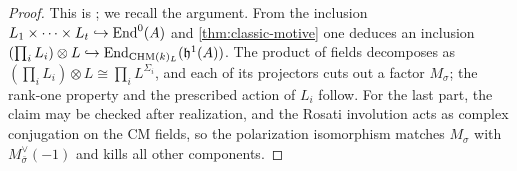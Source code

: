 \begin{proof}
  This is \cite[Corollary 3.2]{Ascona}; we recall the argument. From the
  inclusion \(L_1 \times \cdots \times L_t \hookrightarrow \mathrm{End}^0(A)\) and
  \cref{thm:classic-motive} one deduces an inclusion
  \((\prod_i L_i) \otimes L \hookrightarrow \mathrm{End}_{\mathrm{CHM}(k)_{L}}(\mathfrak{h}^1(A))\). The
  product of fields decomposes as
  \((\prod_i L_i) \otimes L \cong \prod_i L^{\Sigma_i}\), and each of its
  projectors cuts out a factor \(M_\sigma\); the rank-one property and the
  prescribed action of \(L_i\) follow. For the last part, the claim may be
  checked after realization, and the Rosati involution acts as complex
  conjugation on the CM fields, so the polarization isomorphism matches
  \(M_\sigma\) with \(M_{\bar\sigma}^\vee(-1)\) and kills all other components.
\end{proof}

